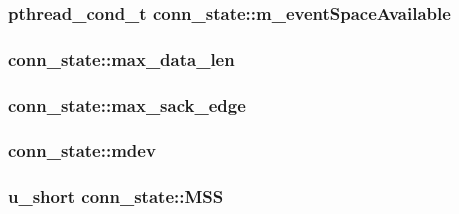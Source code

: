 \hypertarget{structconn__state_aa9f009393861dd5ad935e93de0d74b3e}{
\subsubsection[{m\-\_\-event\-Space\-Available}]{\setlength{\rightskip}{0pt plus 5cm}pthread\-\_\-cond\-\_\-t {\bf conn\-\_\-state\-::m\-\_\-event\-Space\-Available}}}\label{structconn__state_aa9f009393861dd5ad935e93de0d74b3e}
\hypertarget{structconn__state_aaa84be09ddb509f69c3917a0f9e7ad68}{
\subsubsection[{max\-\_\-data\-\_\-len}]{ {\bf conn\-\_\-state\-::max\-\_\-data\-\_\-len}}}\label{structconn__state_aaa84be09ddb509f69c3917a0f9e7ad68}
\hypertarget{structconn__state_a8eecf6d7c7ea18bcc2dc6193b513bf5b}{
\subsubsection[{max\-\_\-sack\-\_\-edge}]{ {\bf conn\-\_\-state\-::max\-\_\-sack\-\_\-edge}}}\label{structconn__state_a8eecf6d7c7ea18bcc2dc6193b513bf5b}
\hypertarget{structconn__state_ac811f4387cce6d0959f6ac07d68d100e}{
\subsubsection[{mdev}]{ {\bf conn\-\_\-state\-::mdev}}}\label{structconn__state_ac811f4387cce6d0959f6ac07d68d100e}
\hypertarget{structconn__state_a621e57bcec647d53b1fa153992a1a3c6}{
\subsubsection[{\-M\-S\-S}]{\setlength{\rightskip}{0pt plus 5cm}u\-\_\-short {\bf conn\-\_\-state\-::\-M\-S\-S}}}\label{structconn__state_a621e57bcec647d53b1fa153992a1a3c6}
